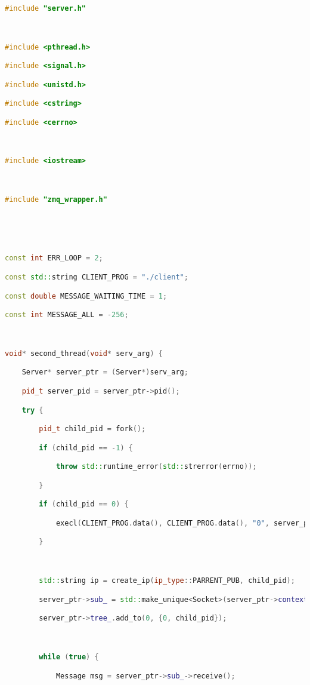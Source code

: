 \begin{lstlisting}[language=C++]

#include "server.h"



#include <pthread.h>

#include <signal.h>

#include <unistd.h>

#include <cstring>

#include <cerrno>



#include <iostream>



#include "zmq_wrapper.h"





const int ERR_LOOP = 2;

const std::string CLIENT_PROG = "./client";

const double MESSAGE_WAITING_TIME = 1;

const int MESSAGE_ALL = -256;



void* second_thread(void* serv_arg) {

    Server* server_ptr = (Server*)serv_arg;

    pid_t server_pid = server_ptr->pid();

    try {

        pid_t child_pid = fork();

        if (child_pid == -1) {

            throw std::runtime_error(std::strerror(errno));

        }

        if (child_pid == 0) {

            execl(CLIENT_PROG.data(), CLIENT_PROG.data(), "0", server_ptr->pub_->ip().data(), NULL);

        }



        std::string ip = create_ip(ip_type::PARRENT_PUB, child_pid);

        server_ptr->sub_ = std::make_unique<Socket>(server_ptr->context_, socket_type::SUB, ip);

        server_ptr->tree_.add_to(0, {0, child_pid});



        while (true) {

            Message msg = server_ptr->sub_->receive();


\end{lstlisting}
